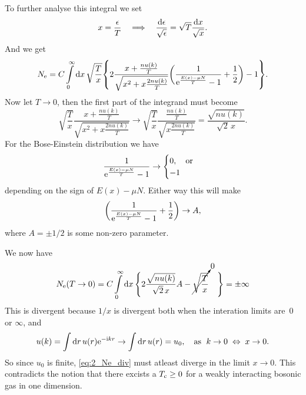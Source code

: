 \documentclass[11pt,letter, swedish, english
]{article}
\begin{document}
To further analyse this integral we set
\begin{equation}
x=\frac{\epsilon}{T}
\quad\Longrightarrow\quad
\frac{\mathrm{d}\epsilon}{\sqrt{\epsilon}}
=\sqrt{T}\frac{\mathrm{d} x}{\sqrt{x}}.
\end{equation}
And we get
\begin{equation}\label{eq:2_Ne_int}
\Ne=C\int_0^\infty\rd{x}\,\sqrt{\frac{T}{x}}
\qty{
2\frac{x+\frac{nu(k)}{T}}{\sqrt{x^2+x\frac{2nu(k)}{T}}}
\qty(\frac{1}{\ee^{\frac{E(x)-\mu N}{T}}-1}+\frac{1}{2})-1
}.
\end{equation}
Now let $T\to0$, then the first part of the integrand must become
\begin{equation}
\sqrt{\frac{T}{x}}
\frac{x+\frac{nu(k)}{T}}{\sqrt{x^2+x\frac{2nu(k)}{T}}}
\to \sqrt{\frac{T}{x}}
\frac{\frac{nu(k)}{T}}{\sqrt{x\frac{2nu(k)}{T}}}
=\frac{\sqrt{nu(k)}}{\sqrt{2}\,x}.
\end{equation}
For the Bose-Einstein distribution we have
\begin{equation}
\frac{1}{\ee^{\frac{E(x)-\mu N}{T}}-1}\to
\begin{cases}
0\qcomma\text{or}\\
-1
\end{cases}
\end{equation}
depending on the sign of $E(x)-\mu N$. Either way this will make
\begin{equation}
\qty(\frac{1}{\mathrm{e}^{\frac{E(x)-\mu N}{T}}-1}+\frac{1}{2})\to A,
\end{equation}
where $A=\pm1/2$ is some non-zero parameter. 

We now have
\begin{equation}\label{eq:2_Ne_div}
\Ne(T\to0)=C\int_0^\infty\rd{x}\,
\Bigg\{
2\frac{\sqrt{nu(k)}}{\sqrt{2}\,x}A
-\cancelto{0}{\sqrt{\frac{T}{x}}} \phantom{00}\Bigg\}
=\pm\infty
\end{equation}
This is divergent because $1/x$ is divergent both when the interation
limits are~0 or $\infty$, and 
\begin{equation}
u(k)=\int\rd{r}\, u(r)\ee^{-\ii kr}
\to\int\rd{r}\, u(r) = u_0 
\qcomma \text{as }\; k\to0 \;\Leftrightarrow\; x\to0.
\end{equation}
So since $u_0$ is finite, \eqref{eq:2_Ne_div} must atleast diverge in
the limit $x\to 0$. This contradicts the notion that there excists a
$T_{\text{c}}\ge0$ for a weakly interacting bosonic gas in one dimension. 
\end{document}

